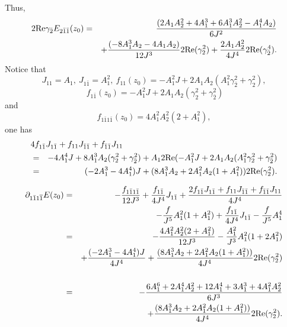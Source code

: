 \documentclass[12pt]{amsart}
\def\1bar{\overline{1}}
\def\d{\partial}
\def\d{\partial}
\begin{document}
Thus,
\begin{eqnarray*}
2\hbox{Re} \gamma_{\bar2} E_{2\bar1\bar1}(z_0)
&=&{(2A_1 A_2^2 
+ 4A_1^3+6A_1^3A_2^2 -A_1^4A_2)  \over 6 J^2}\\
&&+{(-8A_1^3 A_2- 4A_1 A_2)   \over 12 J^3} 2\hbox{Re}(\gamma_2^2) +{2A_1A_2^2\over 4J^4} 2\hbox{Re}( \gamma_{\bar2}^4).
\end{eqnarray*}
Notice that
$$
J_{11}=A_1,\  J_{1\bar1}=A_1^2,\ f_{11}(z_0)=-A_1^2 J+2A_1A_2(A_1^2 \gamma_{\bar2}^2+\gamma_2^2),
$$
$$
\ f_{1\bar1}(z_0)=-A_1^2 J+2A_1A_2(\gamma_2^2+\gamma_{\bar2}^2)
$$
and
$$
f_{1\bar1 1\bar1}(z_0)=4A_1^2A_2^2(2+A_1^2),
$$
one has
\begin{eqnarray*}
\lefteqn{4f_{1\bar1} J_{1\bar1 }+ f_{11} J_{\bar1\bar1}+f_{\bar1\bar1} J_{11} }\\
&=&-4A_1^4 J+8A_1^3A_2(\gamma_2^2+\gamma_{\bar2}^2)
+A_1 2\hbox{Re}(-A_1^2 J+2A_1 A_2(A_1^2 \gamma_2^2+\gamma_{\bar2}^2)\\
&=&(-2A_1^3-4A_1^4) J +(8A_1^3A_2 +2A_1^2A_2(1+A_1^2)) 2\hbox{Re}(\gamma_2^2).
\end{eqnarray*}

\begin{eqnarray*}
\d_{1\bar1  1 \1bar } E(z_0)&=&-{f_{1 \bar1 1\bar1} \over 12 J^3}
+{f_{1\bar1} \over 4 J^4}J_{1\bar1} +{2 f_{1\bar1} J_{1\bar1}+f_{11} J_{\bar1 \bar1}+f_{\bar1\bar1} J_{11} \over 4 J^4} \\
&& -{f \over J^5} A_1^2(1+A_1^2)+{f_{1\bar1} \over 4 J^4} J_{1\bar1}- {f\over  J^5} A_1^4\\
&=&-{4A_1^2 A_2^2(2+A_1^2) \over 12 J^3}-{A_1^2  \over J^3} A_1^2(1+2A_1^2)\\
&&+{(-2A_1^3-4A_1^4) J \over 4J^4}+{(8A_1^3A_2 +2A_1^2A_2(1+A_1^2)) \over 4J^4} 2\hbox{Re}(\gamma_2^2)\\
\\
&=&-{6A_1^6 +2A_1^4 A_2^2 +12A_1^4+3A_1^3+4A_1^2A_2^2 \over 6 J^3}\\
&&+{(8A_1^3A_2 +2A_1^2A_2(1+A_1^2)) \over 4J^4} 2\hbox{Re}(\gamma_2^2).
\end{eqnarray*} 
\end{document}
